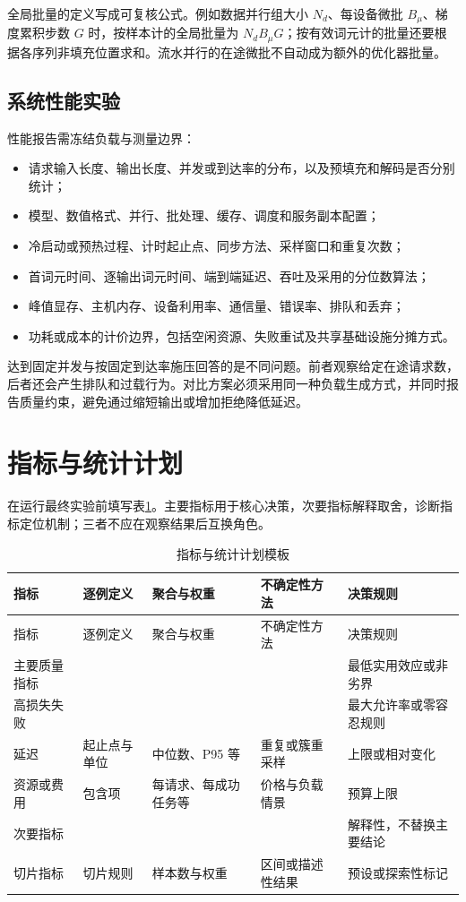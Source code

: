 \documentclass[../textbook.tex]{subfiles}
\begin{document}
全局批量的定义写成可复核公式。例如数据并行组大小 $N_d$、每设备微批 $B_\mu$、梯度累积步数 $G$ 时，按样本计的全局批量为 $N_dB_\mu G$；按有效词元计的批量还要根据各序列非填充位置求和。流水并行的在途微批不自动成为额外的优化器批量。

\subsection{系统性能实验}

性能报告需冻结负载与测量边界：
\begin{itemize}
 \item 请求输入长度、输出长度、并发或到达率的分布，以及预填充和解码是否分别统计；
 \item 模型、数值格式、并行、批处理、缓存、调度和服务副本配置；
 \item 冷启动或预热过程、计时起止点、同步方法、采样窗口和重复次数；
 \item 首词元时间、逐输出词元时间、端到端延迟、吞吐及采用的分位数算法；
 \item 峰值显存、主机内存、设备利用率、通信量、错误率、排队和丢弃；
 \item 功耗或成本的计价边界，包括空闲资源、失败重试及共享基础设施分摊方式。
\end{itemize}

达到固定并发与按固定到达率施压回答的是不同问题。前者观察给定在途请求数，后者还会产生排队和过载行为。对比方案必须采用同一种负载生成方式，并同时报告质量约束，避免通过缩短输出或增加拒绝降低延迟。

\section{指标与统计计划}

在运行最终实验前填写表\ref{tab:appendix-metric-plan}。主要指标用于核心决策，次要指标解释取舍，诊断指标定位机制；三者不应在观察结果后互换角色。

\begin{longtable}{@{}p{.15\linewidth}p{.17\linewidth}p{.17\linewidth}p{.17\linewidth}p{.21\linewidth}@{}}
\caption{指标与统计计划模板}\label{tab:appendix-metric-plan}\\
\toprule
指标 & 逐例定义 & 聚合与权重 & 不确定性方法 & 决策规则\\\midrule
\endfirsthead
\toprule
指标 & 逐例定义 & 聚合与权重 & 不确定性方法 & 决策规则\\\midrule
\endhead
主要质量指标 &  &  &  & 最低实用效应或非劣界\\
高损失失败 &  &  &  & 最大允许率或零容忍规则\\
延迟 & 起止点与单位 & 中位数、P95 等 & 重复或簇重采样 & 上限或相对变化\\
资源或费用 & 包含项 & 每请求、每成功任务等 & 价格与负载情景 & 预算上限\\
次要指标 &  &  &  & 解释性，不替换主要结论\\
切片指标 & 切片规则 & 样本数与权重 & 区间或描述性结果 & 预设或探索性标记\\
\bottomrule
\end{longtable}
\end{document}
